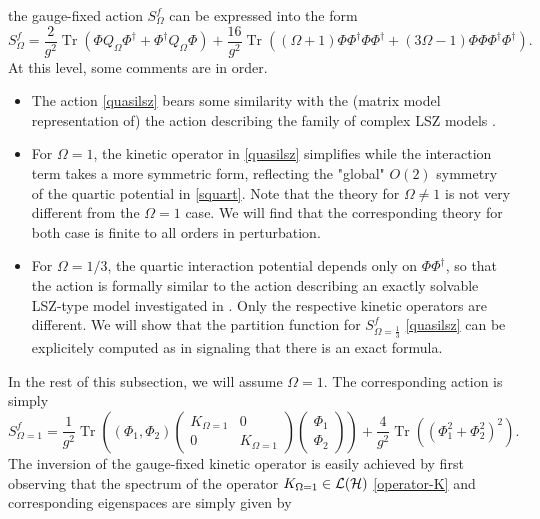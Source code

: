\documentclass[a4paper,11pt,twoside]{article}
\numberwithin{equation}{section}
\DeclareMathOperator{\tr}{Tr}
\theoremstyle{nonumberplain}
\newcounter{and}
\begin{document}
%
the gauge-fixed action $S^f_\Omega$ can be expressed into the form%
%
\begin{equation}
S^f_\Omega = \frac{2}{g^2} \tr\left( \Phi Q_\Omega \Phi^\dag + \Phi^\dag Q_\Omega \Phi \right) + \frac{16}{g^2} \tr\left( (\Omega+1) \Phi\Phi^\dag\Phi\Phi^\dag + (3\Omega-1) \Phi\Phi\Phi^\dag\Phi^\dag \right) .
\label{quasilsz}
\end{equation}
%
At this level, some comments are in order.
\begin{itemize}
%
\item The action \eqref{quasilsz} bears some similarity with the (matrix model representation of) the action describing the family of complex LSZ models \cite{LSZ}.%
%
\item For $\Omega=1$, the kinetic operator in \eqref{quasilsz} simplifies while the interaction term takes a more symmetric form, reflecting the "global" $O(2)$ symmetry of the quartic potential in \eqref{squart}. Note that the theory for $\Omega\ne 1$ is not very different from the $\Omega=1$ case. We will find that the corresponding theory for both case is finite to all orders in perturbation.%
%
\item For $\Omega=1/3$, the quartic interaction potential depends only on $\Phi\Phi^\dag$, so that the action is formally similar to the action describing an exactly solvable LSZ-type model investigated in \cite{LSZ}. Only the respective kinetic operators are different. We will show that the partition function for $S^f_{\Omega=\frac{1}{3}}$ \eqref{quasilsz} can be explicitely computed as in \cite{LSZ} signaling that there is an exact formula.%
%
\end{itemize}
%
In the rest of this subsection, we will assume $\Omega=1$. The corresponding action is simply%
%
\begin{equation}
S^f_{\Omega=1} = \frac{1}{g^2} \tr\left( (\Phi_1,\Phi_2)
\begin{pmatrix}
K_{\Omega=1}&0\\
0&K_{\Omega=1}
\end{pmatrix} 
\begin{pmatrix}
\Phi_1\\
\Phi_2
\end{pmatrix} 
\right)
+ \frac{4}{g^2} \tr\left( (\Phi_1^2 + \Phi_2^2)^2 \right) . \label{critical-action}
\end{equation}
%
The inversion of the gauge-fixed kinetic operator is easily achieved by first observing that the spectrum of the operator $K_{\Omega=1}\in{\cal{L}}({\cal{H}})$ \eqref{operator-K} and corresponding eigenspaces are simply given by%
\end{document}
